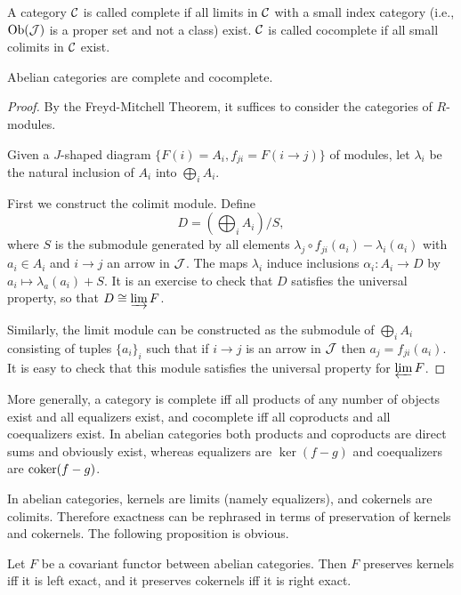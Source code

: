 \begin{defn}
    A category $\mathcal{C}$ is called complete if all limits in $\mathcal{C}$ with a small index category (i.e., $\operatorname{Ob}(\mathcal{J})$ is a proper set and not a class) exist. $\mathcal{C}$ is called cocomplete if all small colimits in $\mathcal{C}$ exist.
\end{defn}

\begin{prop}\label{prop abelian complete and cocomplete}
    Abelian categories are complete and cocomplete.
\end{prop}
\begin{proof}
    By the Freyd-Mitchell Theorem, it suffices to consider the categories of $R$-modules. 
    
    Given a $J$-shaped diagram $\{F(i)=A_i,f_{ji}=F(i\to j)\}$ of modules, let $\lambda_i$ be the natural inclusion of $A_i$ into $\bigoplus_i A_i$. 
    
    First we construct the colimit module. Define
    \[D=\left(\bigoplus_i A_i\right)\slash S,\]
    where $S$ is the submodule generated by all elements $\lambda_j\circ f_{ji}(a_i)-\lambda_i(a_i)$ with $a_i\in A_i$ and $i\to j$ an arrow in $\mathcal{J}$. The maps $\lambda_i$ induce inclusions $\alpha_i: A_i\to D$ by $a_i\mapsto \lambda_a(a_i)+S$. It is an exercise to check that $D$ satisfies the universal property, so that $D\cong \varinjlim F$.

    Similarly, the limit module can be constructed as the submodule of $\bigoplus_i A_i$ consisting of tuples $\{a_i\}_{i}$ such that if $i\to j$ is an arrow in $\mathcal{J}$ then $a_j=f_{ji}(a_i)$. It is easy to check that this module satisfies the universal property for $\varprojlim F$.
\end{proof}
\begin{rem}
    More generally, a category is complete iff all products of any number of objects exist and all equalizers exist, and cocomplete iff all coproducts and all coequalizers exist. In abelian categories both products and coproducts are direct sums and obviously exist, whereas equalizers are $\ker(f-g)$ and coequalizers are $\operatorname{coker}(f-g)$.
\end{rem}

In abelian categories, kernels are limits (namely equalizers), and cokernels are colimits. Therefore exactness can be rephrased in terms of preservation of kernels and cokernels. The following proposition is obvious.

\begin{prop}
    Let $F$ be a covariant functor between abelian categories. Then $F$ preserves kernels iff it is left exact, and it preserves cokernels iff it is right exact.
\end{prop}

